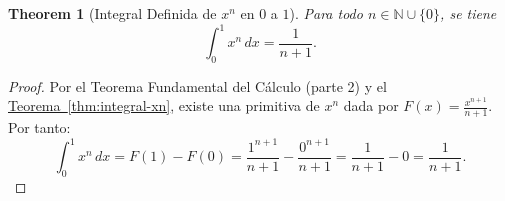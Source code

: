 \documentclass[11pt,a4paper]{article}
\theoremstyle{plain}
\newtheorem{theorem}{Theorem}[section]
\theoremstyle{definition}
\begin{document}
\begin{theorem}[Integral Definida de $x^n$ en $0$ a $1$]\label{thm:integral-definida}
Para todo $n \in \mathbb{N} \cup \{0\}$, se tiene
\[
\int_0^1 x^n \, dx = \frac{1}{n+1}.
\]
\end{theorem}

\begin{proof}
Por el Teorema Fundamental del Cálculo (parte 2) y el \hyperref[thm:integral-xn]{Teorema~\ref{thm:integral-xn}}, existe una primitiva de $x^n$ dada por $F(x) = \frac{x^{n+1}}{n+1}$. Por tanto:
\[
\int_0^1 x^n \, dx = F(1) - F(0) = \frac{1^{n+1}}{n+1} - \frac{0^{n+1}}{n+1} = \frac{1}{n+1} - 0 = \frac{1}{n+1}.
\]
\end{proof}
\end{document}
